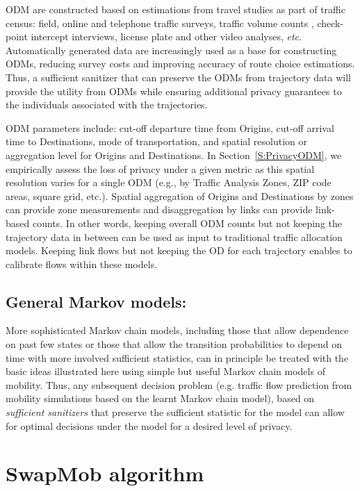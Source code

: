 \documentclass[times,twocolumn,final,authoryear]{elsarticle}
\begin{document}
ODM are constructed based on estimations from travel studies as part of traffic census: field, online and telephone traffic surveys, traffic volume counts \citep{robillard1975}, check-point intercept interviews, license plate and other video analyses, {\it etc}.  
Automatically generated data \citep[e.g. CDR]{iqbal2014} are increasingly used as a base for constructing ODMs, reducing survey costs and improving accuracy of route choice estimations. 
Thus, a sufficient sanitizer that can preserve the ODMs from trajectory data will provide the utility from ODMs while ensuring additional privacy guarantees to the individuals associated with the trajectories. 

ODM parameters include: cut-off departure time from Origins, cut-off arrival time to Destinations, mode of transportation, and spatial resolution or aggregation level for Origins and Destinations. 
In Section~\ref{S:PrivacyODM}, we empirically assess the loss of privacy under a given metric as this spatial resolution varies for a single ODM (e.g., by Traffic Analysis Zones, ZIP code areas, square grid, etc.). Spatial aggregation of Origins and Destinations by zones can provide zone measurements and disaggregation by links can provide link-based counts. 
In other words, keeping overall ODM counts but not keeping the trajectory data in between can be used as input to traditional traffic allocation models. Keeping link flows but not keeping the OD for each trajectory enables to calibrate flows within these models.


\subsection{General Markov models:}
More sophisticated Markov chain models, including those that allow dependence on past few states or those that allow the transition probabilities to depend on time with more involved sufficient statistics, can in principle be treated with the basic ideas illustrated here using simple but useful Markov chain models of mobility. 
Thus, any subsequent decision problem (e.g. traffic flow prediction from mobility simulations based on the learnt Markov chain model), based on {\em sufficient sanitizers} that preserve the sufficient statistic for the model can allow for optimal decisions under the model for a desired level of privacy. 


\section{SwapMob algorithm}\label{Sec:swapmob}
\end{document}
